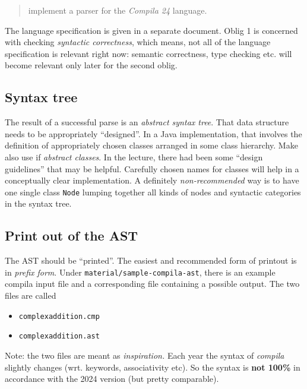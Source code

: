 \documentclass[10pt,freeform]{handout}[2014/08/13]
\begin{document}
\begin{quote}
  implement a parser for the \textsl{Compila 24} language.
\end{quote}
The language specification is given in a separate document. Oblig 1 is
concerned with checking \emph{syntactic correctness}, which means, not all
of the language specification is relevant right now: semantic correctness,
type checking etc. will become relevant only later for the second oblig.


\subsection{Syntax tree}
\label{sec:syntax-tree}

The result of a successful parse is an \emph{abstract syntax tree}. That
data structure needs to be appropriately ``designed''. In a Java
implementation, that involves the definition of appropriately chosen
classes arranged in some class hierarchy. Make also use if \emph{abstract
  classes}. In the lecture, there had been some ``design guidelines'' that
may be helpful. Carefully chosen names for classes will help in a
conceptually clear implementation. A definitely \emph{non-recommended} way
is to have one single class \texttt{Node} lumping together all kinds of
nodes and syntactic categories in the syntax tree.









\subsection{Print out of the AST}
\label{sec:print-out-ast}


The AST should be ``printed''. The easiest and recommended form of printout
is in \emph{prefix form}. Under \texttt{material/sample-compila-ast}, there
is an example compila input file and a corresponding file containing a
possible output. The two files are called

\begin{itemize}
\item \texttt{complexaddition.cmp}
\item \texttt{complexaddition.ast}
\end{itemize}


Note: the two files are meant as \emph{inspiration.} Each year the syntax
of \textsl{compila} slightly changes (wrt. keywords, associativity etc). So
the syntax is \textbf{not 100\%} in accordance with the 2024 version (but
pretty comparable).
\end{document}
